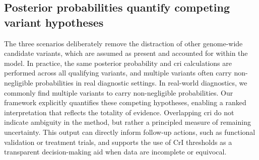 \subsection{Posterior probabilities quantify competing variant hypotheses}

The three scenarios deliberately remove the distraction of other genome-wide candidate variants, which are assumed as present and accounted for within the model. In practice, the same posterior probability and \ac{cri} calculations are performed across all qualifying variants, and multiple variants often carry non-negligible probabilities in real diagnostic settings.
In real-world diagnostics, we commonly find multiple variants to carry non-negligible probabilities. 
Our framework explicitly quantifies these competing hypotheses, enabling a ranked interpretation that reflects the totality of evidence. 
Overlapping \ac{cri} do not indicate ambiguity in the method, but rather a principled measure of remaining uncertainty. 
This output can directly inform follow-up actions, such as functional validation or treatment trials, and supports the use of CrI thresholds as a transparent decision-making aid when data are incomplete or equivocal.

